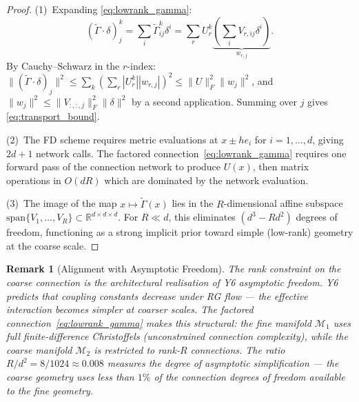 \documentclass[11pt,letterpaper]{article}
\newtheorem{remark}[conjecture]{Remark}
\begin{document}
\begin{proof}
(1)~Expanding \eqref{eq:lowrank_gamma}:
\[
    (\tilde{\Gamma} \cdot \delta)^k_j 
    = \sum_i \tilde{\Gamma}^k_{ij} \delta^i 
    = \sum_r U^k_r \underbrace{\left(\sum_i V_{r,ij} 
    \delta^i\right)}_{w_{r,j}}.
\]
By Cauchy--Schwarz in the $r$-index:
$\|(\tilde{\Gamma} \cdot \delta)_j\|^2 
\leq \sum_k \left(\sum_r |U^k_r| |w_{r,j}|\right)^2 
\leq \|U\|_F^2 \|w_j\|^2$,
and $\|w_j\|^2 \leq \|V_{:,:,j}\|_F^2 \|\delta\|^2$ by a second 
application. Summing over $j$ gives \eqref{eq:transport_bound}.

(2)~The FD scheme requires metric evaluations at 
$x \pm h e_i$ for $i = 1, \ldots, d$, giving $2d + 1$ network 
calls. The factored connection~\eqref{eq:lowrank_gamma} requires 
one forward pass of the connection network to produce $U(x)$, 
then matrix operations in $O(dR)$ which are dominated by the 
network evaluation.

(3)~The image of the map $x \mapsto \tilde{\Gamma}(x)$ lies in 
the $R$-dimensional affine subspace 
$\mathrm{span}\{V_1, \ldots, V_R\} \subset 
\mathbb{R}^{d \times d \times d}$. For $R \ll d$, this 
eliminates $(d^3 - Rd^2)$ degrees of freedom, functioning as a 
strong implicit prior toward simple (low-rank) geometry at the 
coarse scale.
\end{proof}

\begin{remark}[Alignment with Asymptotic 
Freedom]\label{rem:lowrank_y6}
The rank constraint on the coarse connection is the architectural 
realisation of Y6 asymptotic freedom. Y6 predicts that coupling 
constants decrease under RG flow --- the effective interaction 
becomes simpler at coarser scales. The factored 
connection~\eqref{eq:lowrank_gamma} makes this structural: the 
fine manifold $\mathcal{M}_1$ uses full finite-difference 
Christoffels (unconstrained connection complexity), while the 
coarse manifold $\mathcal{M}_2$ is restricted to rank-$R$ 
connections. The ratio 
$R / d^2 = 8/1024 \approx 0.008$ measures the degree of 
asymptotic simplification --- the coarse geometry uses less than 
$1\%$ of the connection degrees of freedom available to the fine 
geometry.
\end{remark}
\end{document}
